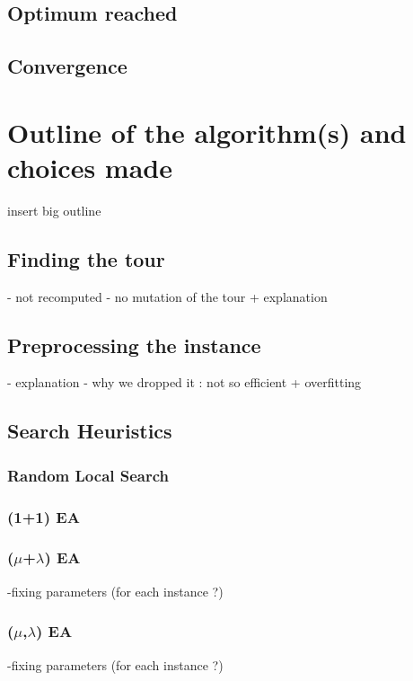 \documentclass[a4paper]{article}
\begin{document}
\subsection{Optimum reached}

\begin{center}
\end{center}

\begin{center}
\end{center}

\subsection{Convergence}


\section{Outline of the algorithm(s) and choices made}
insert big outline
\subsection{Finding the tour}
- not recomputed
- no mutation of the tour + explanation
\subsection{Preprocessing the instance}
- explanation
- why we dropped it : not so efficient + overfitting
\subsection{Search Heuristics}
\subsubsection{Random Local Search}
\subsubsection{(1+1) EA}
\subsubsection{($\mu$+$\lambda$) EA}
-fixing parameters (for each instance ?)
\subsubsection{($\mu$,$\lambda$) EA}
-fixing parameters (for each instance ?)
\end{document}
